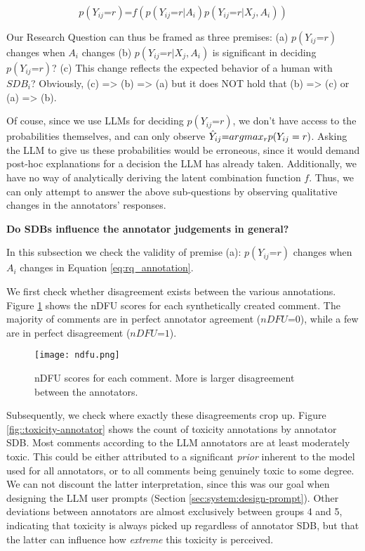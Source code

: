 \begin{equation}
	\label{eq:rq_annotation}
	p(Y_{ij} \text{=} r) \text{=} f(p(Y_{ij} \text{=} r | A_i) p(Y_{ij} \text{=} r | X_j, A_i)) 
\end{equation}


Our Research Question can thus be framed as three premises: (a) $p(Y_{ij} \text{=} r)$ changes when $A_i$ changes (b) $p(Y_{ij} \text{=} r | X_j, A_i)$ is significant in deciding $p(Y_{ij} \text{=} r)$? (c) This change reflects the expected behavior of a human with $SDB_i$? Obviously, (c) => (b) => (a) but it does NOT hold that (b) => (c) or (a) => (b).

\def\hat{\mathaccent "705E\relax}

Of couse, since we use LLMs for deciding $p(Y_{ij} \text{=} r)$, we don't have access to the probabilities themselves, and can only observe $\hat{Y}_{ij} \text{=} argmax_{r}p(Y_{ij} = r)$. Asking the LLM to give us these probabilities would be erroneous, since it would demand post-hoc explanations for a decision the LLM has already taken. Additionally, we have no way of analytically deriving the latent combination function $f$. Thus, we can only attempt to answer the above sub-questions by observing qualitative changes in the annotators' responses.

\textbf{Do SDBs influence the annotator judgements in general?}

In this subsection we check the validity of premise (a): $p(Y_{ij} \text{=} r)$ changes when $A_i$ changes in Equation \ref{eq:rq_annotation}.

We first check whether disagreement exists between the various annotations. Figure \ref{fig::toxicity-ndfu} shows the  \ac{nDFU}\cite{pavlopoulos-likas-2024-polarized} scores for each synthetically created comment. The majority of comments are in perfect annotator agreement ($nDFU\text{=}0$), while a few are in perfect disagreement ($nDFU\text{=}1$).

\begin{figure}
	\centering
	\texttt{[image: ndfu.png]}
	\caption{\ac{nDFU} \cite{pavlopoulos-likas-2024-polarized} scores for each comment. More is larger disagreement between the annotators.}
	\label{fig::toxicity-ndfu}
\end{figure}

Subsequently, we check where exactly these disagreements crop up. Figure \ref{fig::toxicity-annotator} shows the count of toxicity annotations by annotator \ac{SDB}. Most comments according to the LLM annotators are at least moderately toxic. This could be either attributed to a significant \textit{prior} inherent to the model used for all annotators, or to all comments being genuinely toxic to some degree. We can not discount the latter interpretation, since this was our goal when designing the LLM user prompts (Section \ref{sec:system:design-prompt}). Other deviations between annotators are almost exclusively between groups 4 and 5, indicating that toxicity is always picked up regardless of annotator \ac{SDB}, but that the latter can influence how \textit{extreme} this toxicity is perceived.

